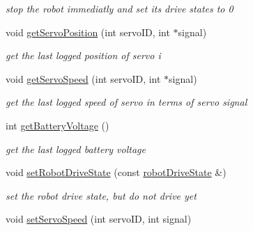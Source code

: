 \begin{DoxyCompactItemize}
\begin{DoxyCompactList}\small\item\em stop the robot immediatly and set its drive states to 0 \end{DoxyCompactList}\item 
void \hyperlink{class_omni_robot_a4990bacab4be83a14508ef4a6859a2a5}{get\+Servo\+Position} (int servo\+I\+D, int $\ast$signal)
\begin{DoxyCompactList}\small\item\em get the last logged position of servo i \end{DoxyCompactList}\item 
void \hyperlink{class_omni_robot_af6051abc3663618772fcf690445cac14}{get\+Servo\+Speed} (int servo\+I\+D, int $\ast$signal)
\begin{DoxyCompactList}\small\item\em get the last logged speed of servo in terms of servo signal \end{DoxyCompactList}\item 
\hypertarget{class_omni_robot_a41817e196ad64ba61daa8bbcc4ccc6c2}{}int \hyperlink{class_omni_robot_a41817e196ad64ba61daa8bbcc4ccc6c2}{get\+Battery\+Voltage} ()\label{class_omni_robot_a41817e196ad64ba61daa8bbcc4ccc6c2}

\begin{DoxyCompactList}\small\item\em get the last logged battery voltage \end{DoxyCompactList}\item 
void \hyperlink{class_omni_robot_a5ccec8006487e526b20e7a5f69255c00}{set\+Robot\+Drive\+State} (const \hyperlink{structrobot_drive_state}{robot\+Drive\+State} \&)
\begin{DoxyCompactList}\small\item\em set the robot drive state, but do not drive yet \end{DoxyCompactList}\item 
\hypertarget{class_omni_robot_a4db727ee61666148106e302e90956bd3}{}void \hyperlink{class_omni_robot_a4db727ee61666148106e302e90956bd3}{set\+Servo\+Speed} (int servo\+I\+D, int signal)\label{class_omni_robot_a4db727ee61666148106e302e90956bd3}


\end{DoxyCompactItemize}
